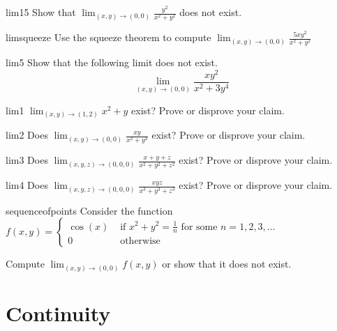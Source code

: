 \begin{problem}{lim15}
Show that $\lim_{(x,y) \to (0,0)} \frac{y^2}{x^2 + y^2}$ does not exist.
\end{problem}

\begin{problem}{limsqueeze}
Use the squeeze theorem to compute $\lim_{(x,y) \to (0,0)} \frac{5xy^2}{x^2+y^2}$
\end{problem}

\begin{problem}{lim5}
Show that the following limit does not exist.
     $$\lim_{(x,y) \to (0,0)} \frac{xy^2}{x^2 + 3y^4}$$
\end{problem}

\begin{problem}{lim1}
$\lim_{(x,y) \to (1,2)} x^2+y$ exist? Prove or disprove your claim.
\end{problem}

\begin{problem}{lim2}
Does $\lim_{(x,y) \to (0,0)} \frac{xy}{x^2 + y^2}$ exist? Prove or disprove your claim.
\end{problem}

\begin{problem}{lim3}
Does $\lim_{(x,y,z) \to (0,0,0)} \frac{x + y+ z}{x^2 + y^2 +z^2}$ exist? Prove or disprove your claim.
\end{problem}

\begin{problem}{lim4}
Does $\lim_{(x,y,z) \to (0,0,0)} \frac{xyz}{x^3 + y^3 +z^3}$ exist? Prove or disprove your claim.
\end{problem}

\begin{problem}{sequenceofpoints}
Consider the function $f(x,y) = \left\{
		\begin{array}{ll}
			\cos(x) & \text{ if } x^2 + y^2 = \frac{1}{n} \text{ for some } n = 1, 2, 3, \dots \\
			0 & \text{ otherwise } 
		\end{array}
		\right.$
		
		Compute $\lim_{(x,y) \to (0,0)} f(x,y)$ or show that it does not exist.	
\end{problem}






\section{Continuity}\label{sec:continuity}

